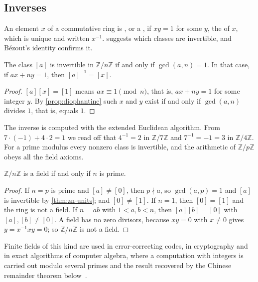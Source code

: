 \subsection{Inverses}

An element $x$ of a commutative ring is , or a , if $xy=1$ for some $y$, the  of $x$, which is unique and written $x^{-1}$.  suggests which classes are invertible, and B\'ezout's identity confirms it.

\begin{theorem}
\label{thm:zn-units}
The class $[a]$ is invertible in $\mathbb Z/n\mathbb Z$ if and only if $\gcd(a,n)=1$. In that case, if $ax+ny=1$, then $[a]^{-1}=[x]$.
\end{theorem}

\begin{proof}
$[a][x]=[1]$ means $ax\equiv1\pmod n$, that is, $ax+ny=1$ for some integer $y$. By \cref{prop:diophantine} such $x$ and $y$ exist if and only if $\gcd(a,n)$ divides $1$, that is, equals $1$.
\end{proof}

The inverse is computed with the extended Euclidean algorithm. From $7\cdot(-1)+4\cdot2=1$ we read off that $4^{-1}=2$ in $\mathbb Z/7\mathbb Z$ and $7^{-1}=-1=3$ in $\mathbb Z/4\mathbb Z$. For a prime modulus every nonzero class is invertible, and the arithmetic of $\mathbb Z/p\mathbb Z$ obeys all the field axioms.

\begin{corollary}
\label{cor:zp-field}
$\mathbb Z/n\mathbb Z$ is a field if and only if $n$ is prime.
\end{corollary}

\begin{proof}
If $n=p$ is prime and $[a]\ne[0]$, then $p\nmid a$, so $\gcd(a,p)=1$ and $[a]$ is invertible by \cref{thm:zn-units}; and $[0]\ne[1]$. If $n=1$, then $[0]=[1]$ and the ring is not a field. If $n=ab$ with $1<a,b<n$, then $[a][b]=[0]$ with $[a],[b]\ne[0]$. A field has no zero divisors, because $xy=0$ with $x\ne0$ gives $y=x^{-1}xy=0$; so $\mathbb Z/n\mathbb Z$ is not a field.
\end{proof}

Finite fields of this kind are used in error-correcting codes, in cryptography and in exact algorithms of computer algebra, where a computation with integers is carried out modulo several primes and the result recovered by the Chinese remainder theorem below~\cite[Sect.~4.3.2]{knuth1997taocp2}.

